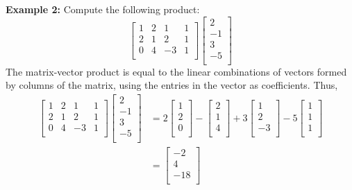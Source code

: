 \documentclass{article}
\begin{document}
\begin{examples}
  \textbf{Example 2:}\newline
  Compute the following product:
  \[
    \begin{bmatrix}
      1 & 2 & 1 & 1\\
      2 & 1 & 2 & 1\\
      0 & 4 & -3 & 1\\
    \end{bmatrix}
    \begin{bmatrix}
      2\\
      -1\\
      3\\
      -5\\
    \end{bmatrix}
  \]
  The matrix-vector product is equal to the linear combinations of vectors formed by columns of the matrix, using the entries in the vector as coefficients. Thus,
  \begin{align*}
    \begin{bmatrix}
      1 & 2 & 1 & 1\\
      2 & 1 & 2 & 1\\
      0 & 4 & -3 & 1\\
    \end{bmatrix}
    \begin{bmatrix}
      2\\
      -1\\
      3\\
      -5\\
    \end{bmatrix} &= 2
    \begin{bmatrix}
      1\\
      2\\
      0\\
    \end{bmatrix} -
    \begin{bmatrix}
      2\\
      1\\
      4\\
    \end{bmatrix} + 3
    \begin{bmatrix}
      1\\
      2\\
      -3\\
    \end{bmatrix}-5
    \begin{bmatrix}
      1\\
      1\\
      1\\
    \end{bmatrix}\\
    &=
    \begin{bmatrix}
      -2\\
      4\\
      -18\\
    \end{bmatrix}
  \end{align*}
\end{examples}
\end{document}
